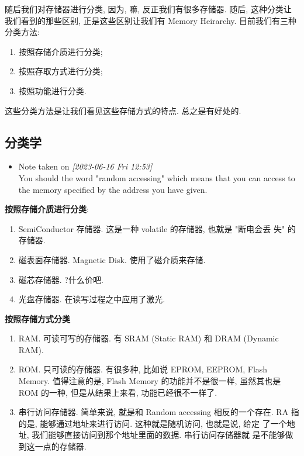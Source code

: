 \documentclass[11pt]{article}
\begin{document}
随后我们对存储器进行分类, 因为, 嘛, 反正我们有很多存储器. 随后, 这种分类让我们看到的那些区别, 正是这些区别让我们有 Memory Heirarchy. 目前我们有三种分类方法: 

\begin{enumerate}
\item 按照存储介质进行分类;
\item 按照存取方式进行分类;
\item 按照功能进行分类.
\end{enumerate}

这些分类方法是让我们看见这些存储方式的特点. 总之是有好处的.

\subsection{分类学}
\label{sec:orga8060b4}

\begin{itemize}
\item Note taken on \textit{[2023-06-16 Fri 12:53] } \\
You should the word "random accessing" which means that you can access to the memory specified by the address you have given.
\end{itemize}

\textbf{按照存储介质进行分类}:
\begin{enumerate}
\item SemiConductor 存储器. 这是一种 volatile 的存储器, 也就是 "断电会丢
失" 的存储器.
\item 磁表面存储器. Magnetic Disk. 使用了磁介质来存储.
\item 磁芯存储器. ?什么价吧.
\item 光盘存储器. 在读写过程之中应用了激光.
\end{enumerate}


\textbf{按照存储方式分类}
\begin{enumerate}
\item RAM. 可读可写的存储器. 有 SRAM (Static RAM) 和 DRAM (Dynamic RAM).
\item ROM. 只可读的存储器. 有很多种, 比如说 EPROM, EEPROM, Flash
Memory. 值得注意的是, Flash Memory 的功能并不是很一样, 虽然其也是
ROM 的一种, 但是从结果上来看, 功能已经很不一样了.
\item 串行访问存储器. 简单来说, 就是和 Random accessing 相反的一个存在.
RA 指的是, 能够通过地址来进行访问. 这种就是随机访问, 也就是说, 给定
了一个地址, 我们能够直接访问到那个地址里面的数据. 串行访问存储器就
是不能够做到这一点的存储器.
\end{enumerate}
\end{document}
